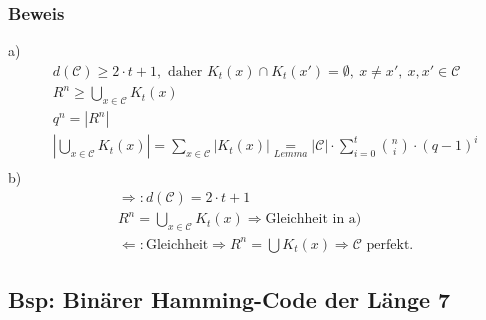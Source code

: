 \subsubsection{Beweis}
a)
\begin{align*}
	&d(\mathcal{C}) \geq 2 \cdot t + 1,\text{ daher }K_t(x) \cap K_t(x')=\emptyset,\ x\neq x',\ x,x' \in \mathcal{C}  \\
	&R^n \geq \underset{x \in \mathcal{C}}{\bigcup} K_t(x) \\
	&q^n=\left|R^n\right| \\
	&\left| \bigcup_{x \in \mathcal{C}} K_t(x) \right| = \sum_{x \in \mathcal{C}} \left| K_t(x) \right|
	\underset{Lemma}{=}\left| \mathcal{C} \right| \cdot \sum_{i=0}^t \binom{n}{i} \cdot (q-1)^i\\
\end{align*}
b)
\begin{align*}
	&\Rightarrow:d(\mathcal{C})=2 \cdot t +1 \\
	&R^n = \bigcup_{x \in \mathcal{C}} K_t(x) \Rightarrow \text{Gleichheit in a)}\\
	&\Leftarrow: \text{Gleichheit} \Rightarrow R^n=\bigcup K_t(x) \Rightarrow \mathcal{C} \text{ perfekt.}
\end{align*}

\subsection{Bsp: Bin\"arer Hamming-Code der L\"ange 7}

